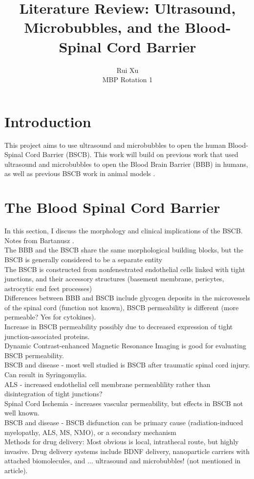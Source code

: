 \documentclass[11pt,titlepage]{article} %
\title{Literature Review: Ultrasound, Microbubbles, and the Blood-Spinal Cord Barrier}
\author{Rui Xu\\MBP Rotation 1}
\date{} %
\begin{document}
\maketitle

\newpage


\section{Introduction}

This project aims to use ultrasound and microbubbles to open the human Blood-Spinal Cord Barrier (BSCB). This work will build on previous work that used ultrasound and microbubbles to open the Blood Brain Barrier (BBB) in humans, as well as previous BSCB work in animal models
.

\section{The Blood Spinal Cord Barrier}

In this section, I discuss the morphology and clinical implications of the BSCB. \\

Notes from Bartanusz \cite{bartanusz2011blood}.\\
The BBB and the BSCB share the same morphological building blocks, but the BSCB is generally considered to be a separate entity\\
The BSCB is constructed from nonfenestrated endothelial cells linked with tight junctions, and their accessory structures (basement membrane, pericytes, astrocytic end feet processes)\\
Differences between BBB and BSCB include glycogen deposits in the microvessels of the spinal cord \cite{sharma2005pathophysiology} (function not known), BSCB permeability is different (more permeable? Yes for cytokines). \\
Increase in BSCB permeability possibly due to decreased expression of tight junction-associated proteins.\\
Dynamic Contrast-enhanced Magnetic Resonance Imaging is good for evaluating BSCB permeability.\\
BSCB and disease - most well studied is BSCB after traumatic spinal cord injury. Can result in Syringomylia.\\
ALS - increased endothelial cell membrane permeablility rather than disintegration of tight junctions?\\
Spinal Cord Ischemia - increases vascular permeability, but effects in BSCB not well known.\\
BSCB and disease - BSCB disfunction can be primary cause (radiation-induced myelopathy, ALS, MS, NMO), or a secondary mechanism\\
Methods for drug delivery: Most obvious is local, intrathecal route, but highly invasive. Drug delivery systems include BDNF delivery, nanoparticle carriers with attached biomolecules, and ... ultrasound and microbubbles! (not mentioned in article).
\end{document}
